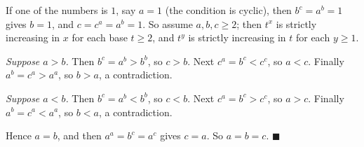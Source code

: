 If one of the numbers is $1$, say $a=1$ (the condition is cyclic), then $b^c=a^b=1$ gives $b=1$, and $c=c^a=a^b=1$. So assume $a,b,c\ge2$; then $t^x$ is strictly increasing in $x$ for each base $t\ge2$, and $t^y$ is strictly increasing in $t$ for each $y\ge1$.

\emph{Suppose $a>b$.} Then $b^c=a^b>b^b$, so $c>b$. Next $c^a=b^c<c^c$, so $a<c$. Finally $a^b=c^a>a^a$, so $b>a$, a contradiction.

\emph{Suppose $a<b$.} Then $b^c=a^b<b^b$, so $c<b$. Next $c^a=b^c>c^c$, so $a>c$. Finally $a^b=c^a<a^a$, so $b<a$, a contradiction.

Hence $a=b$, and then $a^a=b^c=a^c$ gives $c=a$. So $a=b=c$. $\blacksquare$
